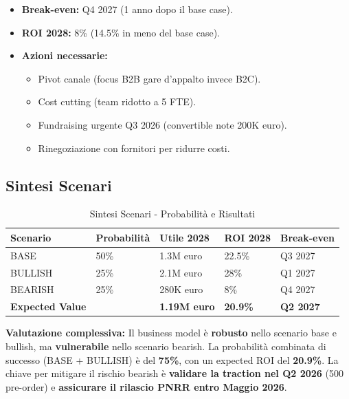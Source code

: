 \documentclass[11pt,a4paper]{report}
\begin{document}
\begin{itemize}
\item {\bf Break-even:} Q4 2027 (1 anno dopo il base case).
\item {\bf ROI 2028:} 8\% (14.5\% in meno del base case).
\item {\bf Azioni necessarie:}
\begin{itemize}
\item Pivot canale (focus B2B gare d'appalto invece B2C).
\item Cost cutting (team ridotto a 5 FTE).
\item Fundraising urgente Q3 2026 (convertible note 200K euro).
\item Rinegoziazione con fornitori per ridurre costi.
\end{itemize}
\end{itemize}

\subsection{Sintesi Scenari}
\begin{table}[H]
\centering
\caption{Sintesi Scenari - Probabilità e Risultati}
\label{tab:scenario-summary}
\begin{tabular}{L{2.5cm} C{1.5cm} C{1.8cm} C{1.5cm} C{1.5cm}}
\toprule
{\bf Scenario} & {\bf Probabilità} & {\bf Utile 2028} & {\bf ROI 2028} & {\bf Break-even} \\
\midrule
BASE & 50\% & 1.3M euro & 22.5\% & Q3 2027 \\
BULLISH & 25\% & 2.1M euro & 28\% & Q1 2027 \\
BEARISH & 25\% & 280K euro & 8\% & Q4 2027 \\
\midrule
{\bf Expected Value} & & {\bf 1.19M euro} & {\bf 20.9\%} & {\bf Q2 2027} \\
\bottomrule
\end{tabular}
\end{table}

{\bf Valutazione complessiva:} Il business model è {\bf robusto} nello scenario base e bullish, ma {\bf vulnerabile} nello scenario bearish. La probabilità combinata di successo (BASE + BULLISH) è del {\bf 75\%}, con un expected ROI del {\bf 20.9\%}. La chiave per mitigare il rischio bearish è {\bf validare la traction nel Q2 2026} (500 pre-order) e {\bf assicurare il rilascio PNRR entro Maggio 2026}.

\end{document}
